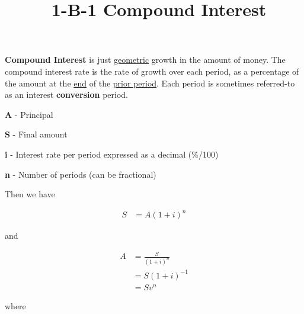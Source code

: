 \documentclass[12pt]{article}
\title{\normalfont\ 1-B-1 Compound Interest} %
\author{} %
\date{}  %
\begin{document}
\maketitle %

\vspace{-1in}

\begin{flushleft}
    \textbf{Compound Interest} is just \underline{geometric} growth in the amount of money.
    The compound interest rate is the rate of growth over each period, as a percentage of
    the amount at the \underline{end} of the \underline{prior period}.  Each period is sometimes referred-to
    as an interest \textbf{conversion} period.
\end{flushleft}
\vspace{.1in}

\begin{description}
    \item\textbf{A} - Principal
    \item\textbf{S} - Final amount
    \item\textbf{i} - Interest rate per period expressed as a decimal {(\%/100)}
    \item\textbf{n} - Number of periods (can be fractional)
\end{description}
\vspace{.1in}

\begin{flushleft}
    Then we have
\end{flushleft}
\vspace{-.1in}

\begin{align*}
    S & = A(1 + i)^n
\end{align*}
\vspace{-.1in}

\begin{flushleft}
    and
\end{flushleft}
\vspace{-.1in}

\begin{align*}
    A & = \frac{S}{(1 + i)^n} \\
      & = S(1+i)^{-1}         \\
      & = Sv^n
\end{align*}

\begin{flushleft}
    where
\end{flushleft}
\vspace{-.1in}
\end{document}
